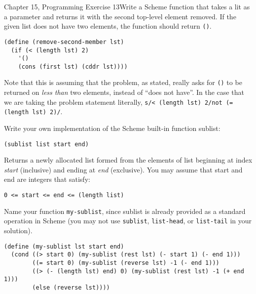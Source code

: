 \documentclass[11pt]{article}
\begin{document}
\begin{ps}
\begin{problemcit}{Chapter 15, Programming Exercise 13}Write a Scheme function that takes a lit as a parameter and returns it with the second top-level element removed. If the given list does not have two elements, the function should return \verb|()|.\end{problemcit}
\begin{soln}
\begin{verbatim}
(define (remove-second-member lst)
  (if (< (length lst) 2)
    '()
    (cons (first lst) (cddr lst))))
\end{verbatim}
Note that this is assuming that the problem, as stated, really asks for \verb|()| to be returned on \emph{less than} two elements, instead of ``does not have''. In the case that we are taking the problem statement literally, \verb|s/< (length lst) 2/not (= (length lst) 2)/|.
\end{soln}
\end{ps}

\begin{ps}
\begin{problemcit}{}Write your own implementation of the Scheme built-in function sublist:

\begin{verbatim}(sublist list start end)\end{verbatim}

    Returns a newly allocated list formed from the elements of list beginning at index \emph{start} (inclusive) and ending at \emph{end} (exclusive). You may assume that start and end are integers that satisfy:
    
\begin{verbatim}0 <= start <= end <= (length list)\end{verbatim}
        
Name your function \verb|my-sublist|, since sublist is already provided as a standard operation in Scheme (you may not use \verb|sublist|, \verb|list-head|, or \verb|list-tail| in your solution).
\end{problemcit}
\begin{soln}
\begin{verbatim}
(define (my-sublist lst start end)
  (cond ((> start 0) (my-sublist (rest lst) (- start 1) (- end 1)))
        ((= start 0) (my-sublist (reverse lst) -1 (- end 1)))
        ((> (- (length lst) end) 0) (my-sublist (rest lst) -1 (+ end 1)))
        (else (reverse lst))))
\end{verbatim}
\end{soln}
\end{ps}
\end{document}
